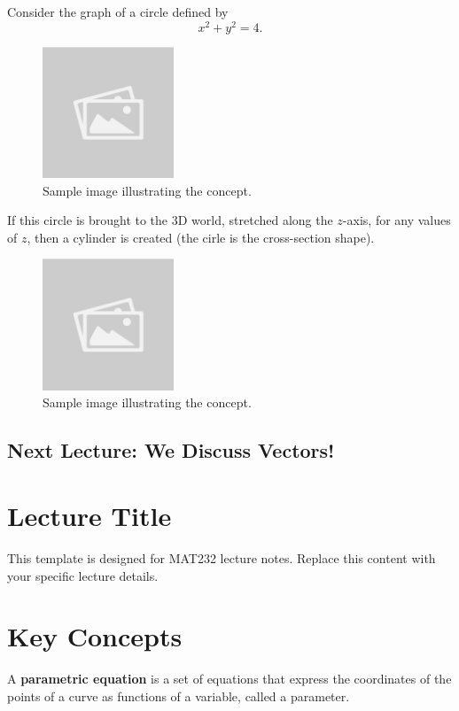\documentclass{article}
\begin{document}
\begin{examplebox}
Consider the graph of a circle defined by
\[
    x^2 + y^2 = 4 \text{.}
\]
\begin{figure}[H]
    \centering
    \includegraphics[width=0.35\textwidth]{sample_image.jpg}
    \caption{Sample image illustrating the concept.}
    \label{fig:sample_image}
\end{figure}
If this circle is brought to the 3D world, stretched along the \( z \)-axis, for any values of \( z \), then a cylinder is created (the cirle is the cross-section shape).
\begin{figure}[H]
    \centering
    \includegraphics[width=0.35\textwidth]{sample_image.jpg}
    \caption{Sample image illustrating the concept.}
    \label{fig:sample_image}
\end{figure}
\end{examplebox}

\subsection*{Next Lecture: We Discuss Vectors!}

\section*{Lecture Title}
\begin{notebox}
This template is designed for MAT232 lecture notes. Replace this content with your specific lecture details.
\end{notebox}

\section*{Key Concepts}
\begin{definitionbox}
A \textbf{parametric equation} is a set of equations that express the coordinates of the points of a curve as functions of a variable, called a parameter.
\end{definitionbox}
\end{document}
